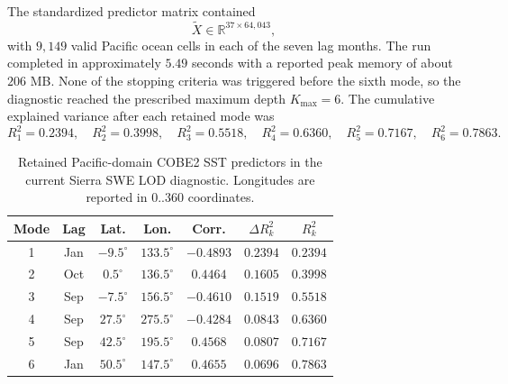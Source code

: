 \documentclass[11pt]{article}
\begin{document}
The standardized predictor matrix contained
\begin{equation}
\widetilde{X}\in\mathbb{R}^{37\times 64{,}043},
\end{equation}
with $9{,}149$ valid Pacific ocean cells in each of the seven lag months. The run completed in
approximately $5.49$ seconds with a reported peak memory of about $206$ MB. None of the stopping
criteria was triggered before the sixth mode, so the diagnostic reached the prescribed maximum
depth $K_{\max}=6$. The cumulative explained variance after each retained mode was
\begin{equation}
R_1^2=0.2394,\quad
R_2^2=0.3998,\quad
R_3^2=0.5518,\quad
R_4^2=0.6360,\quad
R_5^2=0.7167,\quad
R_6^2=0.7863.
\label{eq:cobe2_swe_lod_r2_values}
\end{equation}

\begin{table}[h]
\centering
\caption{Retained Pacific-domain COBE2 SST predictors in the current Sierra SWE LOD diagnostic.
Longitudes are reported in $0..360$ coordinates.}
\begin{tabular}{ccccccc}
\hline
Mode & Lag & Lat. & Lon. & Corr. & $\Delta R_k^2$ & $R_k^2$ \\
\hline
1 & Jan & $-9.5^\circ$ & $133.5^\circ$ & $-0.4893$ & $0.2394$ & $0.2394$ \\
2 & Oct & $0.5^\circ$ & $136.5^\circ$ & $0.4464$ & $0.1605$ & $0.3998$ \\
3 & Sep & $-7.5^\circ$ & $156.5^\circ$ & $-0.4610$ & $0.1519$ & $0.5518$ \\
4 & Sep & $27.5^\circ$ & $275.5^\circ$ & $-0.4284$ & $0.0843$ & $0.6360$ \\
5 & Sep & $42.5^\circ$ & $195.5^\circ$ & $0.4568$ & $0.0807$ & $0.7167$ \\
6 & Jan & $50.5^\circ$ & $147.5^\circ$ & $0.4655$ & $0.0696$ & $0.7863$ \\
\hline
\end{tabular}
\label{tab:cobe2_swe_lod_modes}
\end{table}
\end{document}
